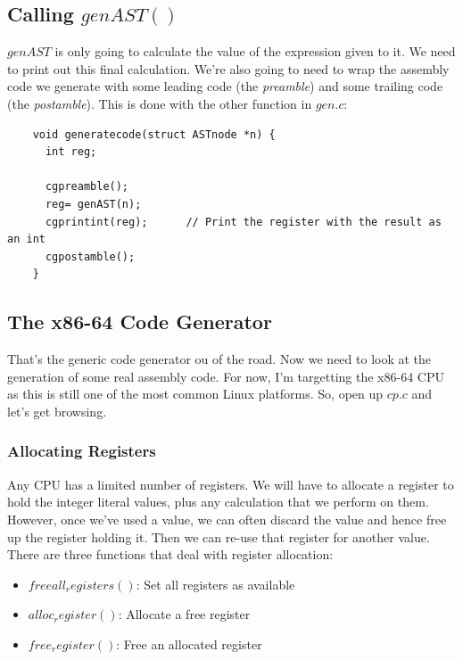 \documentclass[journal, onecolumn, 12pt]{IEEEtran}
\begin{document}
\subsection{Calling $genAST()$}

$genAST$ is only going to calculate the value of the expression given to it. We need to print out this final calculation. We're also going to need to wrap the assembly code we generate with some leading code (the \textit{preamble}) and some trailing code (the \textit{postamble}). This is done with the other function in $gen.c$:

\begin{lstlisting}
    void generatecode(struct ASTnode *n) {
      int reg;
    
      cgpreamble();
      reg= genAST(n);
      cgprintint(reg);      // Print the register with the result as an int
      cgpostamble();
    }  
\end{lstlisting}

\subsection{The x86-64 Code Generator}

That's the generic code generator ou of the road. Now we need to look at the generation of some real assembly code. For now, I'm targetting the x86-64 CPU as this is still one of the most common Linux platforms. So, open up $cp.c$ and let's get browsing.

\subsubsection{Allocating Registers}

Any CPU has a limited number of registers. We will have to allocate a register to hold the integer literal values, plus any calculation that we perform on them. However, once we've used a value, we can often discard the value and hence free up the register holding it. Then we can re-use that register for another value. There are three functions that deal with register allocation:

\begin{itemize}
  \item $freeall_registers()$: Set all registers as available
  \item $alloc_register()$: Allocate a free register
  \item $free_register()$: Free an allocated register
\end{itemize}
\end{document}
